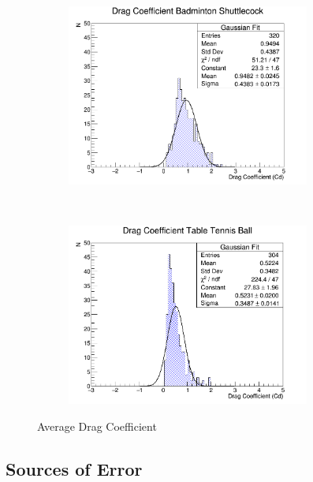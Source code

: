 \documentclass[paper=a4, fontsize=11pt, abstract=on]{scrartcl}
\numberwithin{equation}{section}		%
\numberwithin{figure}{section}			%
\numberwithin{table}{section}				%
\begin{document}
\begin{figure}[H]
        \centering
        \begin{subfigure}[h]{0.5\textwidth}
                \includegraphics[width = 8cm]{hists}
                \caption{}
				
        \end{subfigure}%
       ~~~~~
        \begin{subfigure}[h]{0.5\textwidth}
                \includegraphics[width = 8cm]{histp}
                \caption{}
                
        \end{subfigure}
        \caption{Average Drag Coefficient}
        \label{hist}
\end{figure}

\subsection{Sources of Error}
\end{document}
